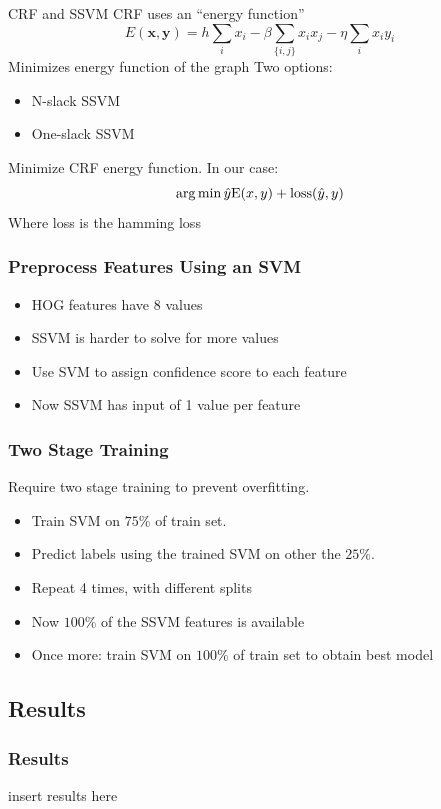 \begin{frame}{CRF and SSVM}
	CRF uses an ``energy function''
$$ E(\mathbf{x}, \mathbf{y}) = h\sum_i x_i - \beta \sum_{\{i, j\}} x_i x_j
- \eta \sum_i x_i y_i $$
Minimizes energy function of the graph
Two options:
\begin{itemize}
	\item N-slack SSVM
	\item One-slack SSVM
\end{itemize}
Minimize CRF energy function. In our case:
$$\operatorname*{arg\,min} \hat{y} \text{E}(x, y) + \text{loss}(\hat{y}, y) $$
Where loss is the hamming loss


\end{frame}

\begin{frame}
\frametitle{Preprocess Features Using an SVM}
\begin{itemize}
\item HOG features have 8 values
\item SSVM is harder to solve for more values
\item Use SVM to assign confidence score to each feature
\item Now SSVM has input of 1 value per feature
\end{itemize}
\end{frame}

\begin{frame}
\frametitle{Two Stage Training}
Require two stage training to prevent overfitting.
\begin{itemize}
\item Train SVM on $75\%$ of train set.
\item Predict labels using the trained SVM on other the $25\%$.
\item Repeat 4 times, with different splits
\item Now $100\%$ of the SSVM features is available
\item Once more: train SVM on $100\%$ of train set to obtain best model
\end{itemize}
\end{frame}

\subsection{Results}

\begin{frame}
\frametitle{Results}
insert results here
\end{frame}

